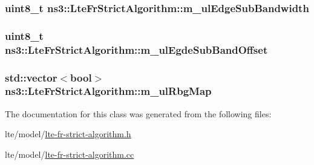 \subsubsection[{\texorpdfstring{m\+\_\+ul\+Edge\+Sub\+Bandwidth}{m_ulEdgeSubBandwidth}}]{\setlength{\rightskip}{0pt plus 5cm}uint8\+\_\+t ns3\+::\+Lte\+Fr\+Strict\+Algorithm\+::m\+\_\+ul\+Edge\+Sub\+Bandwidth\hspace{0.3cm}{\ttfamily [private]}}\hypertarget{classns3_1_1LteFrStrictAlgorithm_a3e5d87899b41ec73b5e4aa65465e497a}{}\label{classns3_1_1LteFrStrictAlgorithm_a3e5d87899b41ec73b5e4aa65465e497a}
\subsubsection[{\texorpdfstring{m\+\_\+ul\+Egde\+Sub\+Band\+Offset}{m_ulEgdeSubBandOffset}}]{\setlength{\rightskip}{0pt plus 5cm}uint8\+\_\+t ns3\+::\+Lte\+Fr\+Strict\+Algorithm\+::m\+\_\+ul\+Egde\+Sub\+Band\+Offset\hspace{0.3cm}{\ttfamily [private]}}\hypertarget{classns3_1_1LteFrStrictAlgorithm_a4f177f41bee1fdb257412b3f83874d8c}{}\label{classns3_1_1LteFrStrictAlgorithm_a4f177f41bee1fdb257412b3f83874d8c}
\subsubsection[{\texorpdfstring{m\+\_\+ul\+Rbg\+Map}{m_ulRbgMap}}]{\setlength{\rightskip}{0pt plus 5cm}std\+::vector$<$bool$>$ ns3\+::\+Lte\+Fr\+Strict\+Algorithm\+::m\+\_\+ul\+Rbg\+Map\hspace{0.3cm}{\ttfamily [private]}}\hypertarget{classns3_1_1LteFrStrictAlgorithm_a03dc05c98509a94c988e950cea9aa3d9}{}\label{classns3_1_1LteFrStrictAlgorithm_a03dc05c98509a94c988e950cea9aa3d9}


The documentation for this class was generated from the following files\+:\begin{DoxyCompactItemize}
\item 
lte/model/\hyperlink{lte-fr-strict-algorithm_8h}{lte-\/fr-\/strict-\/algorithm.\+h}\item 
lte/model/\hyperlink{lte-fr-strict-algorithm_8cc}{lte-\/fr-\/strict-\/algorithm.\+cc}\end{DoxyCompactItemize}
